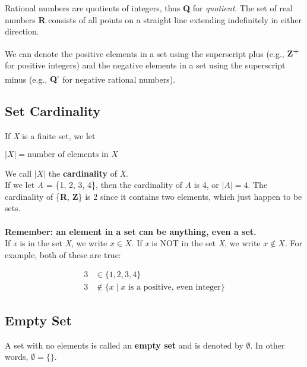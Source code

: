 Rational numbers are quotients of integers, thus \textbf{Q} for \textit{quotient}.  The set of real numbers \textbf{R} consists of all points on a straight line extending indefinitely in either direction.

We can denote the positive elements in a set using the superscript plus (e.g., \textbf{Z\textsuperscript{+}} for positive integers) and the negative elements in a set using the superscript minus (e.g., \textbf{Q\textsuperscript{-}} for negative rational numbers).

\subsection*{Set Cardinality}

If \textit{X} is a finite set, we let
\begin{center}
$|X| = \text{number of elements in } X$
\end{center}

We call $|X|$ the \textbf{cardinality} of \textit{X}.\\

If we let \textit{A} = \{1, 2, 3, 4\}, then the cardinality of \textit{A} is 4, or $|A| = 4$.  The cardinality of \{\textbf{R}, \textbf{Z}\} is 2 since it contains two elements, which just happen to be sets.\\\\\textbf{Remember: an element in a set can be anything, even a set.}\\

If \textit{x} is in the set \textit{X}, we write $x \in X$.  If \textit{x} is NOT in the set \textit{X}, we write $x \not\in X$.  For example, both of these are true:

\begin{align*}
    3 &\in \{1, 2, 3, 4\}\\
    3 &\not\in \{x \mid x \text{ is a positive, even integer}\}
\end{align*}

\subsection*{Empty Set}

A set with no elements is called an \textbf{empty set} and is denoted by $\emptyset$.  In other words, $\emptyset = \{\}.$

\clearpage

